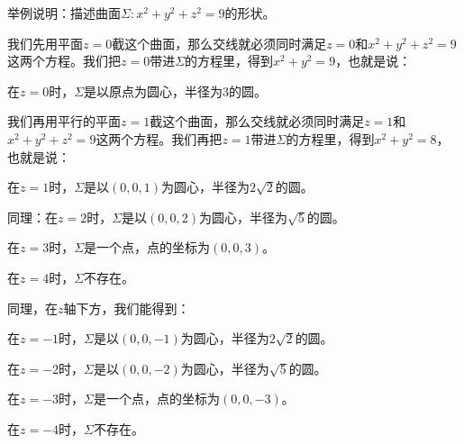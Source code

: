\begin{myexample}
  举例说明：描述曲面$\Sigma: x^2+y^2+z^2=9$的形状。

  我们先用平面$z=0$截这个曲面，那么交线就必须同时满足$z=0$和$x^2+y^2+z^2=9$这两个方程。我们把$z=0$带进$\Sigma$的方程里，得到$x^2+y^2=9$，也就是说：

  在$z=0$时，$\Sigma$是以原点为圆心，半径为$3$的圆。

  我们再用平行的平面$z=1$截这个曲面，那么交线就必须同时满足$z=1$和$x^2+y^2+z^2=9$这两个方程。我们再把$z=1$带进$\Sigma$的方程里，得到$x^2+y^2=8$，也就是说：

  在$z=1$时，$\Sigma$是以$(0,0,1)$为圆心，半径为$2\sqrt{2}$的圆。

  同理：在$z=2$时，$\Sigma$是以$(0,0,2)$为圆心，半径为$\sqrt{5}$的圆。

  在$z=3$时，$\Sigma$是一个点，点的坐标为$(0,0,3)$。

  在$z=4$时，$\Sigma$不存在。

  同理，在$z$轴下方，我们能得到：

  在$z=-1$时，$\Sigma$是以$(0,0,-1)$为圆心，半径为$2\sqrt{2}$的圆。

  在$z=-2$时，$\Sigma$是以$(0,0,-2)$为圆心，半径为$\sqrt{5}$的圆。

  在$z=-3$时，$\Sigma$是一个点，点的坐标为$(0,0,-3)$。

  在$z=-4$时，$\Sigma$不存在。

\begin{center}
\end{center}
\end{myexample}
